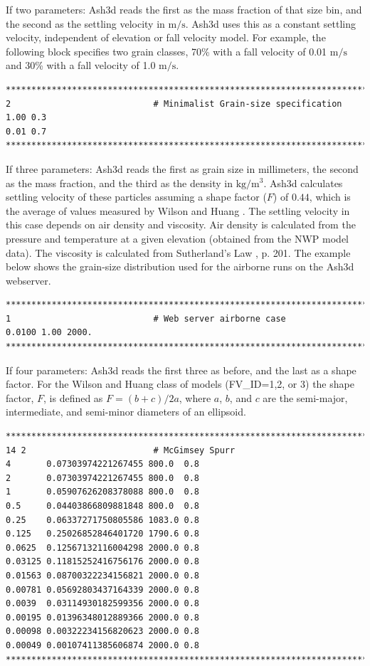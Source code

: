 If two parameters: Ash3d reads the first as the mass fraction of that size bin, and
the second as the settling velocity in $\mathrm{m/s}$. Ash3d uses this as a constant settling
velocity, independent of elevation or fall velocity model. For example, the following block
specifies two grain classes, 70\% with a fall velocity of 0.01 $\mathrm{m/s}$ and 
30\% with a fall velocity of 1.0 $\mathrm{m/s}$.
\small
\begin{verbatim}
*******************************************************************************
2                            # Minimalist Grain-size specification
1.00 0.3
0.01 0.7
*******************************************************************************
\end{verbatim}
\normalsize
If three parameters: Ash3d reads the first as grain size in millimeters, the second
as the mass fraction, and the third as the density in $\mathrm{kg/m^3}$.
Ash3d calculates settling
velocity of these particles assuming a shape factor ($F$) of $0.44$, which is the average
of values measured by Wilson and Huang \cite{Wilson79}. The settling velocity in this case
depends on air density and viscosity. Air density is calculated from the pressure
and temperature at a
given elevation (obtained from the NWP model data). The viscosity is calculated from
Sutherland’s Law \cite{Jacobson05}, p. 201. The example below shows the grain-size
distribution used for the airborne runs on the Ash3d webserver.
\small
\begin{verbatim}
*******************************************************************************
1                            # Web server airborne case
0.0100 1.00 2000.
*******************************************************************************
\end{verbatim}
\normalsize
If four parameters: Ash3d reads the first three as before, and the last as a
shape factor. For the Wilson and Huang class of models (FV\_ID=1,2, or 3)
the shape factor, $F$, is defined as $F=(b+c)/2a$, where $a$, $b$, and $c$ are the
semi-major, intermediate, and semi-minor diameters of an ellipsoid.
\small
\begin{verbatim}
*******************************************************************************
14 2                         # McGimsey Spurr
4       0.07303974221267455 800.0  0.8
2       0.07303974221267455 800.0  0.8
1       0.05907626208378088 800.0  0.8
0.5     0.04403866809881848 800.0  0.8
0.25    0.06337271750805586 1083.0 0.8
0.125   0.25026852846401720 1790.6 0.8
0.0625  0.12567132116004298 2000.0 0.8
0.03125 0.11815252416756176 2000.0 0.8
0.01563 0.08700322234156821 2000.0 0.8
0.00781 0.05692803437164339 2000.0 0.8
0.0039  0.03114930182599356 2000.0 0.8
0.00195 0.01396348012889366 2000.0 0.8
0.00098 0.00322234156820623 2000.0 0.8
0.00049 0.00107411385606874 2000.0 0.8
*******************************************************************************
\end{verbatim}
